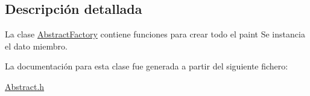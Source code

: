 \subsection{Descripción detallada}
La clase \hyperlink{classAbstractFactory}{Abstract\+Factory} contiene funciones para crear todo el paint  Se instancia el dato miembro. 

La documentación para esta clase fue generada a partir del siguiente fichero\+:\begin{DoxyCompactItemize}
\item 
\hyperlink{Abstract_8h}{Abstract.\+h}\end{DoxyCompactItemize}
